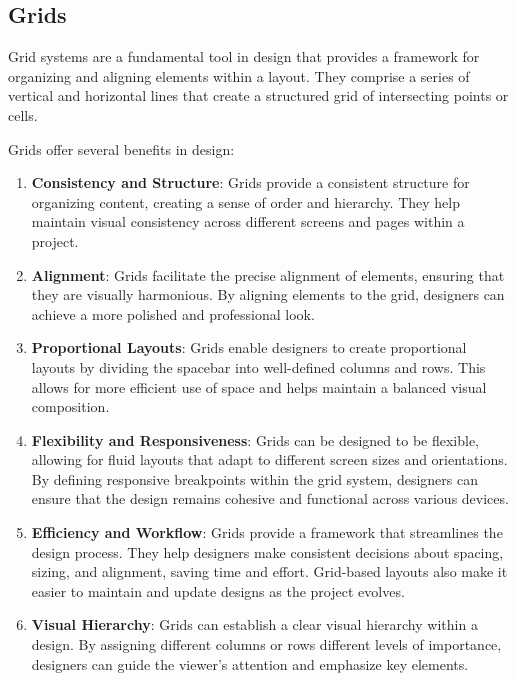 \subsection{Grids}
Grid systems are a fundamental tool in design that provides a framework for organizing and aligning elements within a layout. They comprise a series of vertical and horizontal lines that create a structured grid of intersecting points or cells.

Grids offer several benefits in design:

\begin{enumerate}
  \item \textbf{Consistency and Structure}: Grids provide a consistent structure for organizing content, creating a sense of order and hierarchy. They help maintain visual consistency across different screens and pages within a project.
  
  \item \textbf{Alignment}: Grids facilitate the precise alignment of elements, ensuring that they are visually harmonious. By aligning elements to the grid, designers can achieve a more polished and professional look.
  
  \item \textbf{Proportional Layouts}: Grids enable designers to create proportional layouts by dividing the spacebar into well-defined columns and rows. This allows for more efficient use of space and helps maintain a balanced visual composition.
  
  \item \textbf{Flexibility and Responsiveness}: Grids can be designed to be flexible, allowing for fluid layouts that adapt to different screen sizes and orientations. By defining responsive breakpoints within the grid system, designers can ensure that the design remains cohesive and functional across various devices.
  
  \item \textbf{Efficiency and Workflow}: Grids provide a framework that streamlines the design process. They help designers make consistent decisions about spacing, sizing, and alignment, saving time and effort. Grid-based layouts also make it easier to maintain and update designs as the project evolves.
  
  \item \textbf{Visual Hierarchy}: Grids can establish a clear visual hierarchy within a design. By assigning different columns or rows different levels of importance, designers can guide the viewer’s attention and emphasize key elements.
\end{enumerate}

